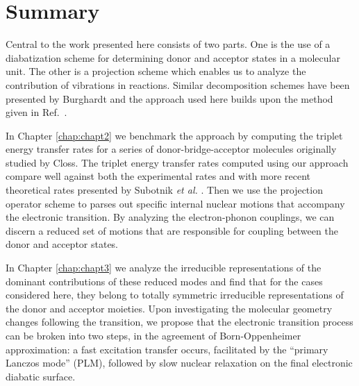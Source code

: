 \section{Summary}

Central to the work presented here consists of two parts. One is the use of a diabatization scheme for determining
donor and acceptor states in a molecular unit. The other is a projection scheme which enables us to analyze the contribution of vibrations in reactions. Similar decomposition schemes have been presented by Burghardt
 \cite{cederbaum2005short,gindensperger2006shortI,gindensperger2006shortII,cederbaum2005short}
 and the approach used here builds upon the method given in Ref.~\cite{pereverzev2009energy}.

In Chapter \ref{chap:chapt2} we benchmark the approach
by computing the  triplet energy transfer rates for a series of donor-bridge-acceptor molecules
originally studied by Closs\cite{miller1984intramolecular}.  The triplet energy transfer rates computed using our approach
compare well against both the experimental rates and with
more recent theoretical rates presented by Subotnik {\em et al.}
\cite{subotnik2008constructing,subotnik2009initial,subotnik2010predicting}.
Then we use the projection operator scheme
to parses out specific internal nuclear motions that accompany
the electronic transition.
 By analyzing the electron-phonon couplings, we can
discern a reduced set of motions that are responsible for coupling between the donor and
acceptor states.

In Chapter \ref{chap:chapt3} we analyze the irreducible
representations  of the dominant contributions of these reduced modes and find that for the cases considered here, they belong to totally symmetric irreducible representations  of
the donor and acceptor moieties. Upon investigating the molecular geometry changes following  the transition,   we propose that the electronic transition process can be
broken into two steps, in the agreement of Born-Oppenheimer approximation:  a fast excitation transfer occurs, facilitated by the ``primary Lanczos mode'' (PLM),
followed by slow nuclear relaxation on the final electronic diabatic surface.


